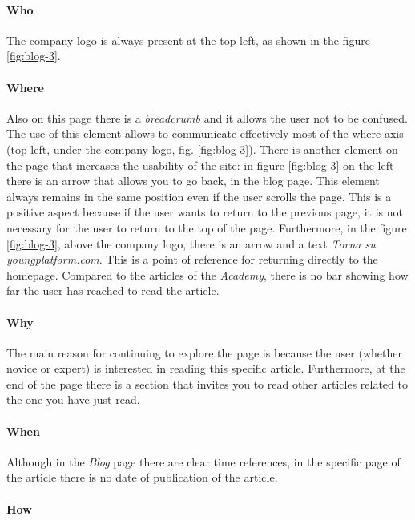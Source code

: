 \paragraph{Who}

The company logo is always present at the top left, as shown in the figure 
\ref{fig:blog-3}.

\paragraph{Where}

Also on this page there is a \textit{breadcrumb} and it allows the user 
not to be confused. The use of this element allows to communicate 
effectively most of the where axis (top left, under the company logo, 
fig. \ref{fig:blog-3}). There is another element on the page that 
increases the usability of the site: in figure \ref{fig:blog-3} on the 
left there is an arrow that allows you to go back, in the blog page. 
This element always remains in the same position even if the user scrolls 
the page. This is a positive aspect because if the user wants to return 
to the previous page, it is not necessary for the user to return to the 
top of the page. Furthermore, in the figure \ref{fig:blog-3}, above the 
company logo, there is an arrow and a text 
\textit{Torna su youngplatform.com}. This is a point of reference for 
returning directly to the homepage. Compared to the articles of the 
\textit{Academy}, there is no bar showing how far the user has reached to 
read the article.

\paragraph{Why}

The main reason for continuing to explore the page is because the user 
(whether novice or expert) is interested in reading this specific article. 
Furthermore, at the end of the page there is a section that invites you to 
read other articles related to the one you have just read.

\paragraph{When}

Although in the \textit{Blog} page there are clear time references, in the 
specific page of the article there is no date of publication of the article.

\paragraph{How}

